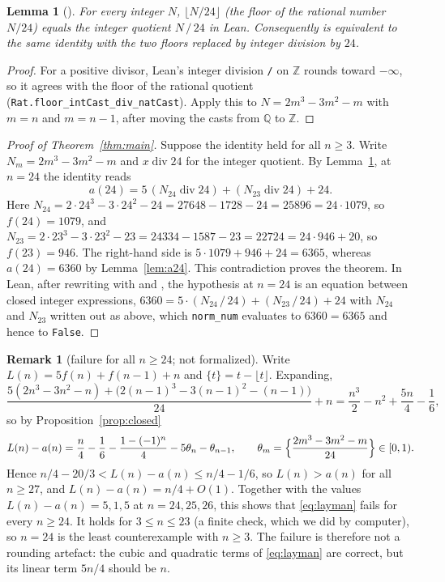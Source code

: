 \documentclass[11pt]{amsart}
\theoremstyle{plain}
\newtheorem{lemma}[theorem]{Lemma}
\theoremstyle{definition}
\newtheorem{remark}[theorem]{Remark}
\newcommand{\Z}{\mathbb{Z}}
\newcommand{\Q}{\mathbb{Q}}
\begin{document}
\begin{lemma}[]\label{lem:ediv}
For every integer $N$, $\lfloor N/24\rfloor$ (the floor of the rational number $N/24$) equals the integer quotient $N\,\mathtt{/}\,24$ in Lean. Consequently  is equivalent to the same identity with the two floors replaced by integer division by $24$.
\end{lemma}

\begin{proof}
For a positive divisor, Lean's integer division \texttt{/} on $\Z$ rounds toward $-\infty$, so it agrees with the floor of the rational quotient (\texttt{Rat.floor\_intCast\_div\_natCast}). Apply this to $N=2m^3-3m^2-m$ with $m=n$ and $m=n-1$, after moving the casts from $\Q$ to $\Z$.
\end{proof}

\begin{proof}[Proof of Theorem~\ref{thm:main}]
Suppose the identity held for all $n\ge3$. Write $N_m=2m^3-3m^2-m$ and $x\operatorname{div}24$ for the integer quotient. By Lemma~\ref{lem:ediv}, at $n=24$ the identity reads
\[
  a(24)=5\,(N_{24}\operatorname{div}24)+(N_{23}\operatorname{div}24)+24 .
\]
Here $N_{24}=2\cdot24^3-3\cdot24^2-24=27648-1728-24=25896=24\cdot1079$, so $f(24)=1079$, and $N_{23}=2\cdot23^3-3\cdot23^2-23=24334-1587-23=22724=24\cdot946+20$, so $f(23)=946$. The right-hand side is $5\cdot1079+946+24=6365$, whereas $a(24)=6360$ by Lemma~\ref{lem:a24}. This contradiction proves the theorem. In Lean, after rewriting with  and , the hypothesis at $n=24$ is an equation between closed integer expressions, $6360=5\cdot(N_{24}\,\mathtt{/}\,24)+(N_{23}\,\mathtt{/}\,24)+24$ with $N_{24}$ and $N_{23}$ written out as above, which \texttt{norm\_num} evaluates to $6360=6365$ and hence to \texttt{False}.
\end{proof}

\begin{remark}[failure for all $n\ge24$; not formalized]\label{rem:all}
Write $L(n)=5f(n)+f(n-1)+n$ and $\{t\}=t-\lfloor t\rfloor$. Expanding,
\[
  \frac{5(2n^3-3n^2-n)+\bigl(2(n-1)^3-3(n-1)^2-(n-1)\bigr)}{24}+n=\frac{n^3}{2}-n^2+\frac{5n}{4}-\frac16,
\]
so by Proposition~\ref{prop:closed}
\[
  L(n)-a(n)=\frac n4-\frac16-\frac{1-(-1)^n}{4}-5\theta_n-\theta_{n-1},\qquad \theta_m=\Bigl\{\frac{2m^3-3m^2-m}{24}\Bigr\}\in[0,1).
\]
Hence $n/4-20/3<L(n)-a(n)\le n/4-1/6$, so $L(n)>a(n)$ for all $n\ge27$, and $L(n)-a(n)=n/4+O(1)$. Together with the values $L(n)-a(n)=5,1,5$ at $n=24,25,26$, this shows that \eqref{eq:layman} fails for every $n\ge24$. It holds for $3\le n\le23$ (a finite check, which we did by computer), so $n=24$ is the least counterexample with $n\ge3$. The failure is therefore not a rounding artefact: the cubic and quadratic terms of \eqref{eq:layman} are correct, but its linear term $5n/4$ should be $n$.
\end{remark}
\end{document}
